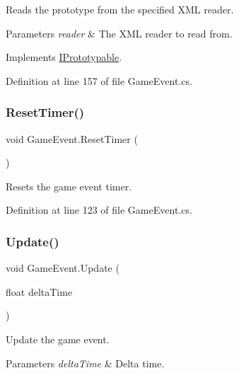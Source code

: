 Reads the prototype from the specified X\+ML reader. 


\begin{DoxyParams}{Parameters}
{\em reader} & The X\+ML reader to read from.\\
\hline
\end{DoxyParams}


Implements \hyperlink{interface_i_prototypable_a024d752c4be655a7166db5718f1fad6a}{I\+Prototypable}.



Definition at line 157 of file Game\+Event.\+cs.

\mbox{\label{class_game_event_adcb077cb4321b37575624d41cca71453}} 
\subsubsection{\texorpdfstring{Reset\+Timer()}{ResetTimer()}}
{\footnotesize\ttfamily void Game\+Event.\+Reset\+Timer (\begin{DoxyParamCaption}{ }\end{DoxyParamCaption})}



Resets the game event timer. 



Definition at line 123 of file Game\+Event.\+cs.

\mbox{\label{class_game_event_af2a343f2404849a8b171c5a34dc75168}} 
\subsubsection{\texorpdfstring{Update()}{Update()}}
{\footnotesize\ttfamily void Game\+Event.\+Update (\begin{DoxyParamCaption}\item[{float}]{delta\+Time }\end{DoxyParamCaption})}



Update the game event. 


\begin{DoxyParams}{Parameters}
{\em delta\+Time} & Delta time.\\
\hline
\end{DoxyParams}


